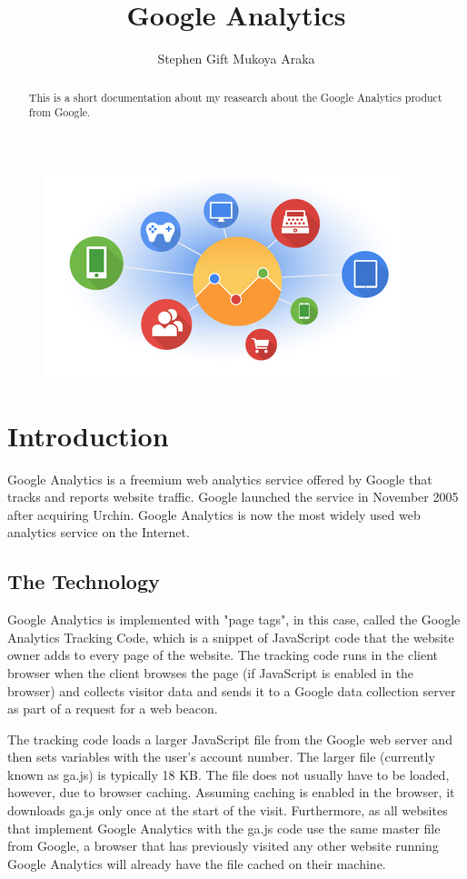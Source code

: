 \documentclass {article}
\begin{document}
\begin {figure}
\centering 
\includegraphics[scale=0.3]{googleanalytics.png}
\label {Photo1}
\end {figure}


\title {Google Analytics}
\author {Stephen Gift Mukoya Araka}
\maketitle 

\begin {abstract}
This is a short documentation about my reasearch about the Google Analytics product from Google.
\end {abstract}


\section {Introduction}
Google Analytics is a \cite{plaza2011google} freemium web analytics service offered by Google \cite{ghemawat2003google} that tracks and reports website traffic. Google launched the service in November 2005 after acquiring Urchin. Google Analytics is now the most widely used web analytics service on the Internet.

\subsection {The Technology}
Google Analytics is implemented with "page tags", in this case, called the Google Analytics Tracking Code, which is a snippet of JavaScript \cite{flanagan2006javascript} code that the website owner adds to every page of the website. The tracking code runs in the client browser when the client browses the page (if JavaScript is enabled in the browser) and collects visitor data and sends it to a Google data collection server as part of a request for a web beacon.

The tracking code loads a larger JavaScript file from the Google web server and then sets variables with the user's account number. The larger file (currently known as ga.js) is typically 18 KB. The file does not usually have to be loaded, however, due to browser caching. Assuming caching is enabled in the browser, it downloads ga.js only once at the start of the visit. Furthermore, as all websites that implement Google Analytics with the ga.js code use the same master file from Google, a browser that has previously visited any other website running Google Analytics will already have the file cached on their machine.
\end{document}
